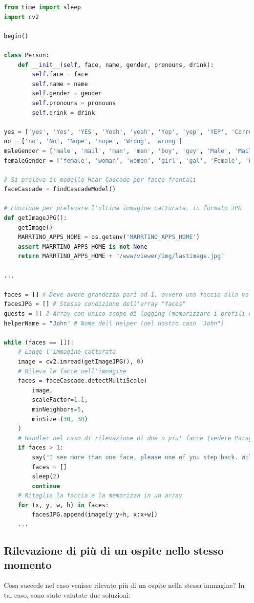 \documentclass[italian, twoside]{sapthesis} %
\begin{document}
\begin{lstlisting}[language=Python]
from time import sleep
import cv2

begin()

class Person:
    def __init__(self, face, name, gender, pronouns, drink):
        self.face = face
        self.name = name
        self.gender = gender
        self.pronouns = pronouns
        self.drink = drink

yes = ['yes', 'Yes', 'YES', 'Yeah', 'yeah', 'Yep', 'yep', 'YEP', 'Correct', 'correct', 'Right', 'right']
no = ['no', 'No', 'Nope', 'nope', 'Wrong', 'wrong']
maleGender = ['male', 'mail', 'man', 'men', 'boy', 'guy', 'Male', 'Mail', 'Man', 'Men', 'Boy', 'Guy']
femaleGender = ['female', 'woman', 'women', 'girl', 'gal', 'Female', 'Woman', 'Women', 'Girl', 'Gal']

# Si preleva il modello Haar Cascade per facce frontali
faceCascade = findCascadeModel()

# Funzione per prelevare l'ultima immagine catturata, in formato JPG
def getImageJPG():
    getImage()
    MARRTINO_APPS_HOME = os.getenv('MARRTINO_APPS_HOME')
    assert MARRTINO_APPS_HOME is not None
    return MARRTINO_APPS_HOME + "/www/viewer/img/lastimage.jpg"

...

faces = [] # Deve avere grandezza pari ad 1, ovvero una faccia alla volta
facesJPG = [] # Stessa condizione dell'array "faces"
guests = [] # Array con unico scopo di logging (memorizzare i profili degli ospiti)
helperName = "John" # Nome dell'helper (nel nostro caso "John")

while (faces == []):
    # Legge l'immagine catturata
    image = cv2.imread(getImageJPG(), 0)
    # Rileva le facce nell'immagine
    faces = faceCascade.detectMultiScale(
        image,
        scaleFactor=1.1,
        minNeighbors=5,
        minSize=(30, 30)
    )
    # Handler nel caso di rilevazione di due o piu' facce (vedere Paragrafo 5.2.1)
    if faces > 1:
        say("I see more than one face, please one of you step back. Will check again in 2 seconds.")
        faces = []
        sleep(2)
        continue
    # Ritaglia la faccia e la memorizza in un array
    for (x, y, w, h) in faces:
        facesJPG.append(image[y:y+h, x:x+w])
    ...
\end{lstlisting}

\subsection{Rilevazione di più di un ospite nello stesso momento}
Cosa succede nel caso venisse rilevato più di un ospite nella stessa immagine? In tal caso, sono state valutate due soluzioni:
\end{document}
